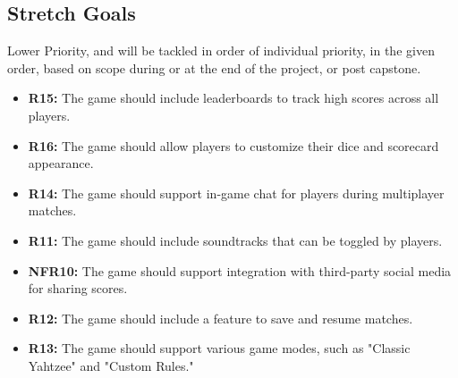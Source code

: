\subsection{Stretch Goals}
Lower Priority, and will be tackled in order of individual priority, in the given order, based on scope during or at the end of the project, or post capstone.
\begin{itemize}
    \item \textbf{R15:} The game should include leaderboards to track high scores across all players.
    \item \textbf{R16:} The game should allow players to customize their dice and scorecard appearance.
    \item \textbf{R14:} The game should support in-game chat for players during multiplayer matches.
    \item \textbf{R11:} The game should include soundtracks that can be toggled by players.
    \item \textbf{NFR10:} The game should support integration with third-party social media for sharing scores.
    \item \textbf{R12:} The game should include a feature to save and resume matches.
    \item \textbf{R13:} The game should support various game modes, such as "Classic Yahtzee" and "Custom Rules."
\end{itemize}

